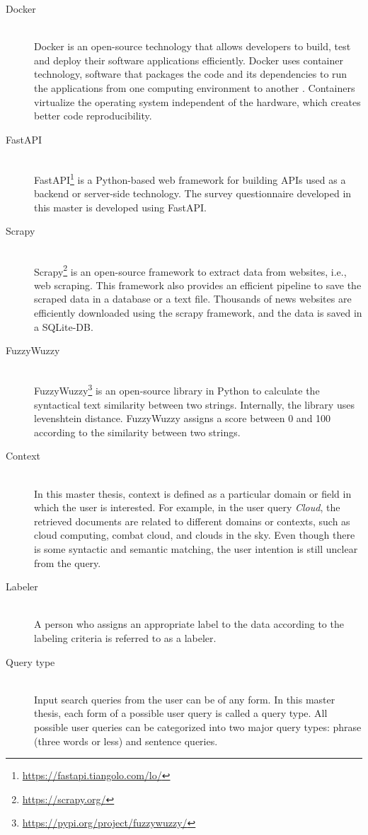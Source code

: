 \begin{description}
	\item[Docker] \hfill \\ Docker is an open-source technology that allows developers to build, test and
	deploy their software applications efficiently. Docker uses container technology, software that packages the code and its dependencies to run the applications from one
	computing environment to another \cite{dockerWhatContainer}. Containers virtualize the operating
	system independent of the hardware, which creates better code reproducibility.  
	
	\item[FastAPI] \hfill \\ FastAPI\footnote{\url{https://fastapi.tiangolo.com/lo/}} is a Python-based web framework for building APIs used as a
	backend or server-side technology. The survey questionnaire developed in this master is
	developed using FastAPI.
	
	\item[Scrapy] \hfill \\ Scrapy\footnote{\url{https://scrapy.org/}} is an open-source framework to extract data from websites, i.e., web scraping. This framework also provides an efficient pipeline to save the scraped data in a database or a text file. Thousands of news websites are efficiently downloaded using the scrapy framework, and the data is saved in a SQLite-DB.
	
	 \item[FuzzyWuzzy] \hfill \\ FuzzyWuzzy\footnote{\url{https://pypi.org/project/fuzzywuzzy/}} is an open-source library in Python to calculate the syntactical text similarity between two strings. Internally, the library uses levenshtein distance. FuzzyWuzzy assigns a score between 0 and 100 according to the similarity between two strings.
	
	\item[Context] \hfill \\ In this master thesis, context is defined as a particular domain or field in which the user is interested. For example, in the user query \textit{Cloud}, the retrieved documents are related to different domains or contexts, such as cloud computing, combat cloud, and clouds in the sky. Even though there is some syntactic and semantic matching, the user intention is still unclear from the query.
	
	\item[Labeler] \hfill \\ A person who assigns an appropriate label to the data according to the labeling criteria is referred to as a labeler.
	
	\item[Query type] \hfill \\ Input search queries from the user can be of any form. In this master thesis, each form of a possible user query is called a query type. All possible user queries can be categorized into two major query types: phrase (three words or less) and sentence queries.
	
	
\end{description}



